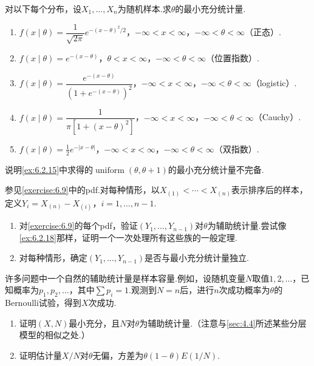 \begin{exercise}\label{exercise:6.9}
对以下每个分布，设$X_1,\ldots,X_n$为随机样本.求$\theta$的最小充分统计量.
\begin{enumerate}[label=(\alph*)]
\item $f(x\mid\theta)=\dfrac1{\sqrt{2\pi}}e^{-(x-\theta)^2/2}$，$-\infty<x<\infty$，$-\infty<\theta<\infty$（正态）.
\item $f(x\mid\theta)=e^{-(x-\theta)}$，$\theta<x<\infty$，$-\infty<\theta<\infty$（位置指数）.
\item $f(x\mid\theta)=\dfrac{e^{-(x-\theta)}}{(1+e^{-(x-\theta)})^2}$，$-\infty<x<\infty$，$-\infty<\theta<\infty$（logistic）.
\item $f(x\mid\theta)=\dfrac1{\pi[1+(x-\theta)^2]}$，$-\infty<x<\infty$，$-\infty<\theta<\infty$（Cauchy）.
\item $f(x\mid\theta)=\tfrac12e^{-|x-\theta|}$，$-\infty<x<\infty$，$-\infty<\theta<\infty$（双指数）.
\end{enumerate}
\end{exercise}
\begin{exercise}\label{exercise:6.10}
说明\autoref{ex:6.2.15}中求得的$\operatorname{uniform}(\theta,\theta+1)$的最小充分统计量不完备.
\end{exercise}
\begin{exercise}\label{exercise:6.11}
参见\autoref{exercise:6.9}中的pdf.对每种情形，以$X_{(1)}<\cdots<X_{(n)}$表示排序后的样本，定义$Y_i=X_{(n)}-X_{(i)}$，$i=1,\ldots,n-1$.
\begin{enumerate}[label=(\alph*)]
\item 对\autoref{exercise:6.9}的每个pdf，验证$(Y_1,\ldots,Y_{n-1})$对$\theta$为辅助统计量.尝试像\autoref{ex:6.2.18}那样，证明一个一次处理所有这些族的一般定理.
\item 对每种情形，确定$(Y_1,\ldots,Y_{n-1})$是否与最小充分统计量独立.
\end{enumerate}
\end{exercise}
\begin{exercise}\label{exercise:6.12}
许多问题中一个自然的辅助统计量是样本容量.例如，设随机变量$N$取值$1,2,\ldots$，已知概率为$p_1,p_2,\ldots$，其中$\sum p_i=1$.观测到$N=n$后，进行$n$次成功概率为$\theta$的Bernoulli试验，得到$X$次成功.
\begin{enumerate}[label=(\alph*)]
\item 证明$(X,N)$最小充分，且$N$对$\theta$为辅助统计量.（注意与\autoref{sec:4.4}所述某些分层模型的相似之处.）
\item 证明估计量$X/N$对$\theta$无偏，方差为$\theta(1-\theta)E(1/N)$.
\end{enumerate}
\end{exercise}
